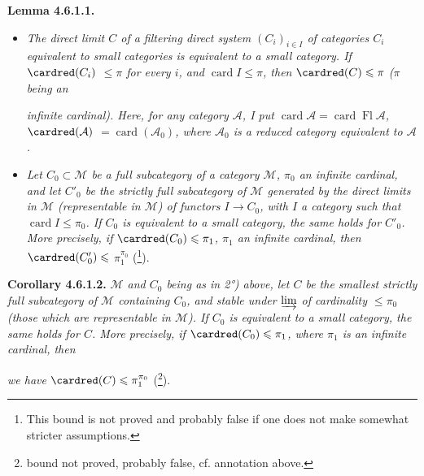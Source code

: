 \textbf{Lemma 4.6.1.1.}
\begin{itemize}[leftmargin=2.5em]
\item[\textit{1°)}] \textit{The direct limit $C$ of a filtering direct system $(C_i)_{i\in I}$ of categories $C_i$ equivalent to small categories is equivalent to a small category. If $\cardred(C_i)$ $\leqslant\pi$ for every $i$, and $\operatorname{card}I\leqslant\pi$, then $\cardred(C)\leqslant\pi$ ($\pi$ being an} %


\textit{infinite cardinal). Here, for any category $\mathcal{A}$, I put $\operatorname{card}\mathcal{A}=\operatorname{card}\operatorname{Fl}\mathcal{A}$, $\cardred(\mathcal{A})$ $=\operatorname{card}(\mathcal{A}_0)$, where $\mathcal{A}_0$ is a reduced category equivalent to $\mathcal{A}$.}
\item[\textit{2°)}] \textit{Let $C_0\subset\mathcal{M}$ be a full subcategory of a category $\mathcal{M}$, $\pi_0$ an infinite cardinal, and let $C'_0$ be the strictly full subcategory of $\mathcal{M}$ generated by the direct limits in $\mathcal{M}$ (representable in $\mathcal{M}$) of functors $I\longrightarrow C_0$, with $I$ a category such that $\operatorname{card}I\leqslant\pi_0$. If $C_0$ is equivalent to a small category, the same holds for $C'_0$. More precisely, if $\cardred(C_0)\leqslant\pi_1$, $\pi_1$ an infinite cardinal, then $\cardred(C'_0)\leqslant$ $\pi_1^{\pi_0}$} (\footnote[56]{This bound is not proved and probably false if one does not make somewhat stricter assumptions.}). %
\end{itemize}

\textbf{Corollary 4.6.1.2.} \textit{$\mathcal{M}$ and $C_0$ being as in 2°) above, let $C$ be the smallest strictly full subcategory of $\mathcal{M}$ containing $C_0$, and stable under $\varinjlim$ of cardinality $\leqslant\pi_0$ (those which are representable in $\mathcal{M}$). If $C_0$ is equivalent to a small category, the same holds for $C$. More precisely, if $\cardred(C_0)\leqslant\pi_1$, where $\pi_1$ is an infinite cardinal, then}


\textit{we have $\cardred(C)\leqslant\pi_1^{\pi_0}$} (\footnote[57]{bound not proved, probably false, cf. annotation above.}).

